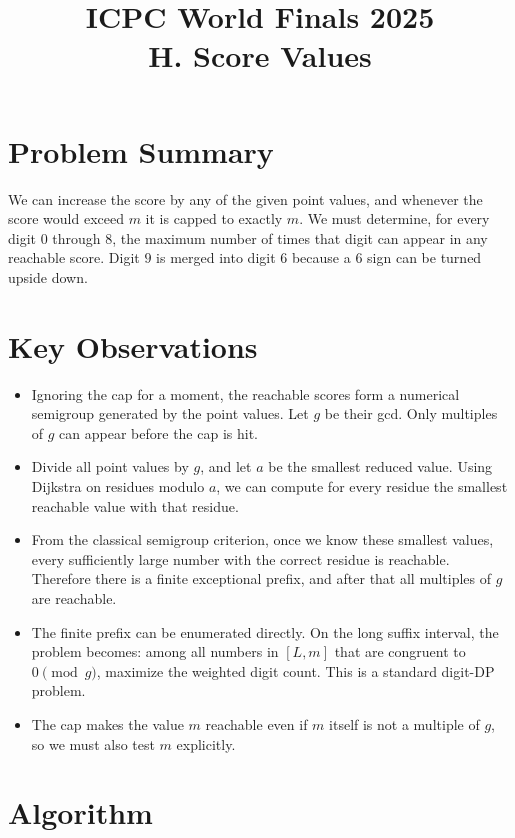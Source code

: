 \documentclass[11pt]{article}
\title{ICPC World Finals 2025\\H. Score Values}
\author{}
\date{}
\begin{document}
\maketitle

\section*{Problem Summary}

We can increase the score by any of the given point values, and whenever the score would exceed $m$ it
is capped to exactly $m$. We must determine, for every digit $0$ through $8$, the maximum number of
times that digit can appear in any reachable score. Digit $9$ is merged into digit $6$ because a $6$ sign
can be turned upside down.

\section*{Key Observations}

\begin{itemize}[leftmargin=*]
    \item Ignoring the cap for a moment, the reachable scores form a numerical semigroup generated by the
    point values. Let $g$ be their gcd. Only multiples of $g$ can appear before the cap is hit.
    \item Divide all point values by $g$, and let $a$ be the smallest reduced value.
    Using Dijkstra on residues modulo $a$, we can compute for every residue the smallest reachable value
    with that residue.
    \item From the classical semigroup criterion, once we know these smallest values, every sufficiently
    large number with the correct residue is reachable. Therefore there is a finite exceptional prefix, and
    after that all multiples of $g$ are reachable.
    \item The finite prefix can be enumerated directly.
    On the long suffix interval, the problem becomes:
    among all numbers in $[L,m]$ that are congruent to $0 \pmod g$, maximize the weighted digit count.
    This is a standard digit-DP problem.
    \item The cap makes the value $m$ reachable even if $m$ itself is not a multiple of $g$, so we must also
    test $m$ explicitly.
\end{itemize}

\section*{Algorithm}
\end{document}
